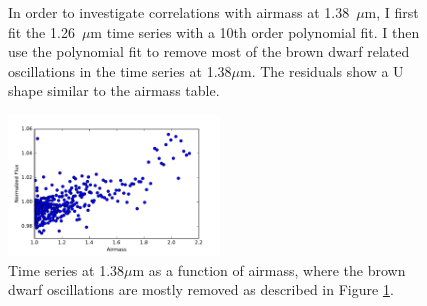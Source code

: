 \documentclass[manuscript]{aastex6}
\begin{document}
\begin{figure}[!t]
\centering
{}
	\caption{In order to investigate correlations with airmass at 1.38~$\mu$m, I first fit the 1.26~$\mu$m time series with a 10th order polynomial fit.
	I then use the polynomial fit to remove most of the brown dwarf related oscillations in the time series at 1.38$\mu$m. The residuals show a U shape similar to the airmass table.}
	\label{fig:airmassTimeSer1p38}
\end{figure} 


\begin{figure}
\begin{centering}
\includegraphics[width=0.5\textwidth]{images/airmass/airmass_flux_correlation.pdf}
\caption{Time series at 1.38$\mu$m as a function of airmass, where the brown dwarf oscillations are mostly removed as described in Figure \ref{fig:airmassTimeSer1p38}.}\label{fig:residAirmass1p38corr}
\end{centering}
\end{figure}
\end{document}

